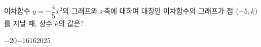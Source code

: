 이차함수 $y=-\dfrac{4}{5}x^2$의 그래프와 $x$축에 대하여 대칭인 이차함수의 그래프가 점 $(-5{,}\mkern3mu k)$를 지날 때, 상수 $k$의 값은?
\begin{choices32}{$-20$}{$-16$}{$16$}{$20$}{$25$}\end{choices32}
